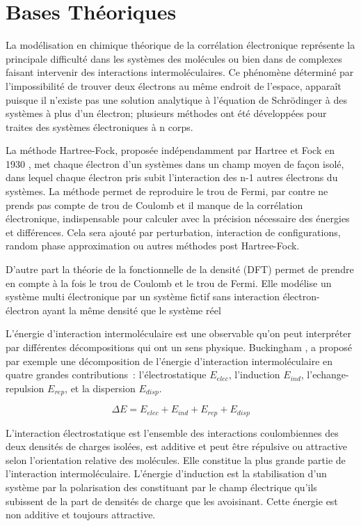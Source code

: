 \section{Bases Théoriques}

La modélisation en chimique théorique de la corrélation électronique représente la principale difficulté dans les systèmes des molécules ou bien dans de complexes faisant intervenir des interactions intermoléculaires. Ce phénomène déterminé par l’impossibilité de trouver deux électrons au même endroit de l’espace, apparaît puisque il n’existe pas une solution analytique à l’équation de  Schrödinger à des systèmes à plus d’un électron; plusieurs méthodes ont été développées pour traites des systèmes électroniques à n corps.

La méthode Hartree-Fock, proposée indépendamment par Hartree et Fock en 1930 \cite{slater1930note}, met chaque électron d’un systèmes dans un champ moyen de façon isolé, dans lequel chaque électron pris subit l’interaction des n-1 autres électrons du systèmes. La méthode permet de reproduire le trou de Fermi, par contre ne prends pas compte de trou de Coulomb et il manque de la corrélation électronique, indispensable pour calculer avec la précision nécessaire des énergies et différences. Cela sera ajouté par perturbation, interaction de configurations, random phase approximation ou autres méthodes post Hartree-Fock.

D'autre part la théorie de la fonctionnelle de la densité (DFT) permet de prendre en compte à la fois le trou de Coulomb et le trou de Fermi. Elle modélise un système multi électronique par un système fictif sans interaction électron- électron  ayant la même densité que le système réel

L’énergie d’interaction intermoléculaire est une observable qu’on peut interpréter par différentes décompositions qui ont un sens physique. Buckingham \cite{buckingham1967permanent}, a proposé par exemple une décomposition de l’énergie d’interaction intermoléculaire en quatre grandes contributions : l’électrostatique $E_{elec}$, l’induction $E_{ind}$, l’echange-repulsion $E_{rep}$, et la dispersion $E_{disp}$.

\begin{equation}
\Delta E = E_{elec} + E_{ind} + E_{rep} + E_{disp}
\end{equation} 

L’interaction électrostatique est l’ensemble des interactions coulombiennes des deux densités de charges isolées, est additive et peut être répulsive ou attractive selon l’orientation relative des molécules. Elle constitue la plus grande partie de l’interaction intermoléculaire.  
L’énergie d’induction est la stabilisation d’un système par la polarisation des constituant par le champ électrique qu’ils subissent de la part de densités de charge que les avoisinant. Cette énergie est non additive et toujours attractive.

